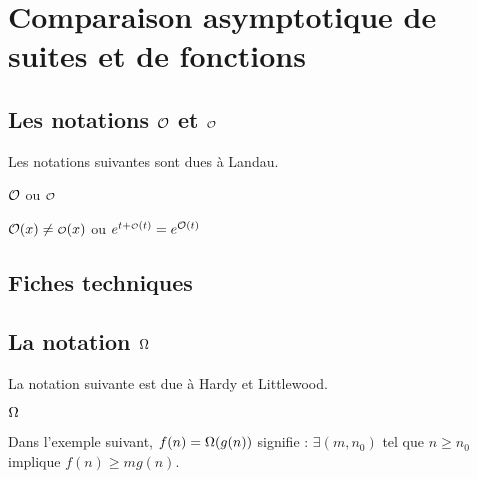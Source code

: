 \documentclass[12pt,a4paper]{article}
\begin{document}
\section{Comparaison asymptotique de suites et de fonctions}

\subsection{\texorpdfstring{Les notations $\operatorname{\mathcal{O}}$ et $\smallO$}%
                           {Les notations "grand O" et "petit O"}}

\newparaexample{}

Les notations suivantes sont dues à Landau.

\begin{latexex}
$\operatorname{\mathcal{O}}$ ou $\smallO$
\end{latexex}




\newparaexample{}

\begin{latexex}
$\bigO(x) \neq \smallO(x)$ ou
$e^{t + \smallO(t)} = e^{\bigO(t)}$
\end{latexex}




\subsection{Fiches techniques}






\subsection{\texorpdfstring{La notation $\operatorname{\bm{\Omega}}$}%
                           {La notation "grand Omega"}}

\newparaexample{}

La notation suivante est due à Hardy et Littlewood.

\begin{latexex}
$\operatorname{\bm{\Omega}}$
\end{latexex}




\newparaexample{}

Dans l'exemple suivant, $f(n) = \operatorname{\bm{\Omega}}(g(n))$ signifie :
$\exists (m, n_0)$ tel que $n \geq n_0$ implique $f(n) \geq m g(n)$.
\end{document}
